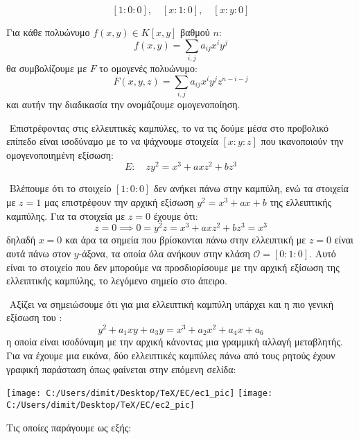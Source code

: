 \documentclass[oneside,a4paper]{article}
\begin{document}
$$[1:0:0], \quad [x:1:0], \quad [x:y:0]$$ 


\vspace*{0.1cm}
\noindent Για κάθε πολυώνυμο $f(x,y) \in K[x,y]$ βαθμού $n$:
$$f(x,y) = \sum\limits_{i,j} a_{ij}x^i y^j$$ θα συμβολίζουμε με $F$ το ομογενές πολυώνυμο:
$$F(x,y,z) = \sum\limits_{i,j} a_{ij}x^i y^j z^{n-i-j}$$ και αυτήν την διαδικασία την ονομάζουμε ομογενοποίηση.

$ $\newline
Επιστρέφοντας στις ελλειπτικές καμπύλες, το να τις δούμε μέσα στο προβολικό επίπεδο είναι ισοδύναμο με το να ψάχνουμε στοιχεία $[x:y:z]$ που ικανοποιούν την ομογενοποιημένη εξίσωση:
$$E: \quad zy^2 =  x^3 + axz^2 + bz^3$$

$ $\newline
Βλέπουμε ότι το στοιχείο $[1:0:0]$ δεν ανήκει πάνω στην καμπύλη, ενώ τα στοιχεία με $z=1$ μας επιστρέφουν την αρχική εξίσωση $y^2 = x^3 + ax +b$ της ελλειπτικής καμπύλης. Για τα στοιχεία με $z=0$ έχουμε ότι:
$$z= 0 \implies 0 = y^2z = x^3 + axz^2 + bz^3 = x^3$$ δηλαδή $x=0$ και άρα τα σημεία που βρίσκονται πάνω στην ελλειπτική με $z=0$ είναι αυτά πάνω στον $y$-άξονα, τα οποία όλα ανήκουν στην κλάση $\mathcal{O} = [0:1:0]$. Αυτό είναι το στοιχείο που δεν μπορούμε να προσδιορίσουμε με την αρχική εξίσωση της ελλειπτικής καμπύλης, το λεγόμενο σημείο στο άπειρο.

$ $\newline
Αξίζει να σημειώσουμε ότι για μια ελλειπτική καμπύλη υπάρχει και η πιο γενική εξίσωση του :
$$y^2 +a_1 xy + a_3 y = x^3 +a_2 x^2 + a_4 x + a_6$$ η οποία είναι ισοδύναμη με την αρχική κάνοντας μια γραμμική αλλαγή μεταβλητής. Για να έχουμε μια εικόνα, δύο ελλειπτικές καμπύλες πάνω από τους ρητούς έχουν γραφική παράσταση όπως φαίνεται στην επόμενη σελίδα:
\begin{center}
	\texttt{[image: C:/Users/dimit/Desktop/TeX/EC/ec1\_pic]}
	\texttt{[image: C:/Users/dimit/Desktop/TeX/EC/ec2\_pic]}
\end{center}
\pagebreak
\noindent Τις οποίες παράγουμε ως εξής:
\end{document}
